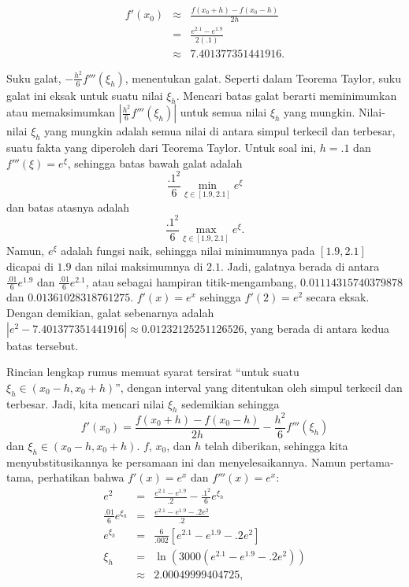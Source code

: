 \begin{description}
\begin{eqnarray*}
f'(x_{0}) & \approx & \frac{f(x_{0}+h)-f(x_{0}-h)}{2h}\\
 & = & \frac{e^{2.1}-e^{1.9}}{2(.1)}\\
 & \approx & 7.401377351441916.
\end{eqnarray*}
\item [{\ref{exc:calculusErrors-8}a:}] Suku galat, $-\frac{h^{2}}{6}f'''(\xi_{h})$,
menentukan galat. Seperti dalam Teorema Taylor, suku galat ini eksak
untuk suatu nilai $\xi_{h}$. Mencari batas galat berarti meminimumkan
atau memaksimumkan $|\frac{h^{2}}{6}f'''(\xi_{h})|$ untuk semua nilai
$\xi_{h}$ yang mungkin. Nilai-nilai $\xi_{h}$ yang mungkin adalah
semua nilai di antara simpul terkecil dan terbesar, suatu fakta yang
diperoleh dari Teorema Taylor. Untuk soal ini, $h=.1$ dan $f'''(\xi)=e^{\xi}$,
sehingga batas bawah galat adalah 
\[
\frac{.1^{2}}{6}\min_{\xi\in[1.9,2.1]}e^{\xi}
\]
dan batas atasnya adalah
\[
\frac{.1^{2}}{6}\max_{\xi\in[1.9,2.1]}e^{\xi}.
\]
Namun, $e^{\xi}$ adalah fungsi naik, sehingga nilai minimumnya pada
$[1.9,2.1]$ dicapai di $1.9$ dan nilai maksimumnya di $2.1$. Jadi,
galatnya berada di antara $\frac{.01}{6}e^{1.9}$ dan $\frac{.01}{6}e^{2.1}$,
atau sebagai hampiran titik-mengambang, $0.01114315740379878$ dan
$0.01361028318761275$. $f'(x)=e^{x}$ sehingga $f'(2)=e^{2}$ secara
eksak. Dengan demikian, galat sebenarnya adalah $|e^{2}-7.401377351441916|\approx0.01232125251126526$,
yang berada di antara kedua batas tersebut.
\item [{\ref{exc:calculusErrors-9}a:}] Rincian lengkap rumus memuat syarat
tersirat ``untuk suatu $\xi_{h}\in(x_{0}-h,x_{0}+h)$'', dengan
interval yang ditentukan oleh simpul terkecil dan terbesar. Jadi,
kita mencari nilai $\xi_{h}$ sedemikian sehingga
\[
f'(x_{0})=\frac{f(x_{0}+h)-f(x_{0}-h)}{2h}-\frac{h^{2}}{6}f'''(\xi_{h})
\]
dan $\xi_{h}\in(x_{0}-h,x_{0}+h)$. $f$, $x_{0}$, dan $h$ telah
diberikan, sehingga kita menyubstitusikannya ke persamaan ini dan
menyelesaikannya. Namun pertama-tama, perhatikan bahwa $f'(x)=e^{x}$
dan $f'''(x)=e^{x}$:
\begin{eqnarray*}
e^{2} & = & \frac{e^{2.1}-e^{1.9}}{.2}-\frac{.1^{2}}{6}e^{\xi_{h}}\\
\frac{.01}{6}e^{\xi_{h}} & = & \frac{e^{2.1}-e^{1.9}-.2e^{2}}{.2}\\
e^{\xi_{h}} & = & \frac{6}{.002}\left[e^{2.1}-e^{1.9}-.2e^{2}\right]\\
\xi_{h} & = & \ln(3000(e^{2.1}-e^{1.9}-.2e^{2}))\\
 & \approx & 2.00049999404725,
\end{eqnarray*}

\end{description}
